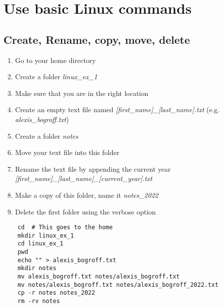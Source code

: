 
\setcounter{section}{0}


\section{Use basic Linux commands}


\subsection{Create, Rename, copy, move, delete}


\begin{enumerate}
    \item Go to your home directory
    \item Create a folder \textit{linux\_ex\_1}
    \item Make sure that you are in the right location
    \item Create an empty text file named \textit{[first\_name]\_[last\_name].txt} (e.g. \textit{alexis\_bogroff.txt})
    \item Create a folder \textit{notes}
    \item Move your text file into this folder
    \item Rename the text file by appending the current year \textit{[first\_name]\_[last\_name]\_[current\_year].txt}
    \item Make a copy of this folder, name it \textit{notes\_2022}
    \item Delete the first folder using the verbose option
\end{enumerate}


\ifdefined\answer
\begin{verbatim}
    cd  # This goes to the home
    mkdir linux_ex_1
    cd linux_ex_1
    pwd
    echo "" > alexis_bogroff.txt
    mkdir notes
    mv alexis_bogroff.txt notes/alexis_bogroff.txt
    mv notes/alexis_bogroff.txt notes/alexis_bogroff_2022.txt
    cp -r notes notes_2022
    rm -rv notes
\end{verbatim}
\fi


